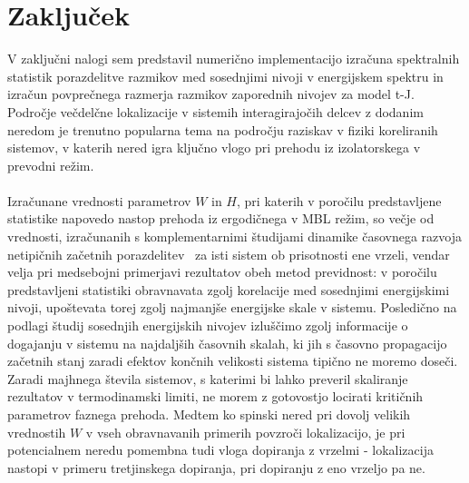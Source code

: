 \documentclass[10pt,a4paper]{article}
\begin{document}
\section{Zaključek}
V zaključni nalogi sem predstavil numerično implementacijo izračuna spektralnih statistik porazdelitve razmikov med sosednjimi nivoji v energijskem spektru in izračun povprečnega razmerja razmikov zaporednih nivojev za model t-J. Področje večdelčne lokalizacije v sistemih interagirajočih delcev z dodanim neredom  je trenutno popularna tema na področju raziskav v fiziki koreliranih sistemov, v katerih nered igra ključno vlogo pri prehodu iz izolatorskega v prevodni režim.\\\\
Izračunane vrednosti parametrov $W$ in $H$, pri katerih v poročilu predstavljene statistike napovedo nastop prehoda iz ergodičnega v MBL režim, so večje od vrednosti, izračunanih s komplementarnimi študijami dinamike časovnega razvoja netipičnih začetnih porazdelitev~\cite{lemut2017complete} za isti sistem ob prisotnosti ene vrzeli, vendar velja pri medsebojni primerjavi rezultatov obeh metod previdnost: v poročilu predstavljeni statistiki obravnavata zgolj korelacije med sosednjimi energijskimi nivoji, upoštevata torej zgolj najmanjše energijske skale v sistemu.
 Posledično na podlagi študij sosednjih energijskih nivojev izluščimo zgolj informacije o dogajanju v sistemu na najdaljših časovnih skalah, ki jih s časovno propagacijo začetnih stanj zaradi efektov končnih velikosti sistema tipično ne moremo doseči. Zaradi majhnega števila sistemov, s katerimi bi lahko preveril skaliranje rezultatov v termodinamski limiti, ne morem z gotovostjo locirati kritičnih parametrov faznega prehoda. Medtem ko spinski nered pri dovolj velikih vrednostih $W$ v vseh obravnavanih primerih povzroči lokalizacijo, je pri potencialnem neredu pomembna tudi vloga dopiranja z vrzelmi - lokalizacija nastopi v primeru tretjinskega dopiranja, pri dopiranju z eno vrzeljo pa ne. 
%



\end{document}
